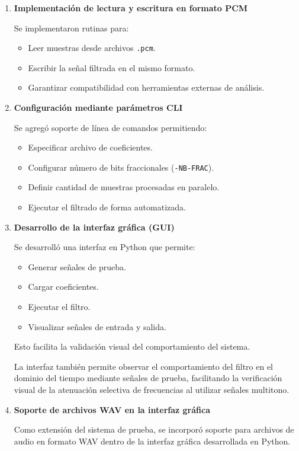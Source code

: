 \documentclass[a4,11pt]{article}
\begin{document}
\begin{enumerate}
\item \textbf{Implementación de lectura y escritura en formato PCM}

Se implementaron rutinas para:
\begin{itemize}
\item Leer muestras desde archivos \texttt{.pcm}.
\item Escribir la señal filtrada en el mismo formato.
\item Garantizar compatibilidad con herramientas externas de análisis.
\end{itemize}

\item \textbf{Configuración mediante parámetros CLI}

Se agregó soporte de línea de comandos permitiendo:
\begin{itemize}
\item Especificar archivo de coeficientes.
\item Configurar número de bits fraccionales (\texttt{-NB-FRAC}).
\item Definir cantidad de muestras procesadas en paralelo.
\item Ejecutar el filtrado de forma automatizada.
\end{itemize}

\item \textbf{Desarrollo de la interfaz gráfica (GUI)}

Se desarrolló una interfaz en Python que permite:
\begin{itemize}
\item Generar señales de prueba.
\item Cargar coeficientes.
\item Ejecutar el filtro.
\item Visualizar señales de entrada y salida.
\end{itemize}

Esto facilita la validación visual del comportamiento del sistema.

\par La interfaz también permite observar el comportamiento del filtro en el dominio del tiempo mediante señales de prueba, facilitando la verificación visual de la atenuación selectiva de frecuencias al utilizar señales multitono.

\item \textbf{Soporte de archivos WAV en la interfaz gráfica}

Como extensión del sistema de prueba, se incorporó soporte para archivos de audio en formato WAV dentro de la interfaz gráfica desarrollada en Python.


\end{enumerate}
\end{document}
